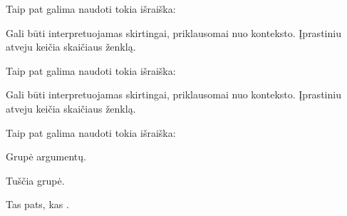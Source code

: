 \documentclass[letterpaper,10pt,lithuanian]{sphinxmanual}
\begin{document}

\begin{fulllineitems}
\label{\detokenize{formules:func.positive}}
\pysigstartsignatures
{}
\pysigstopsignatures
\sphinxAtStartPar
Taip pat galima naudoti tokia išraiška:

\begin{sphinxVerbatim}[commandchars=\\\{\}]
\end{sphinxVerbatim}

\sphinxAtStartPar
Gali būti interpretuojamas skirtingai, priklausomai nuo konteksto.
Įprastiniu atveju keičia skaičiaus ženklą.

\end{fulllineitems}


\begin{fulllineitems}
\label{\detokenize{formules:func.negative}}
\pysigstartsignatures
{}
\pysigstopsignatures
\sphinxAtStartPar
Taip pat galima naudoti tokia išraiška:

\begin{sphinxVerbatim}[commandchars=\\\{\}]
\end{sphinxVerbatim}

\sphinxAtStartPar
Gali būti interpretuojamas skirtingai, priklausomai nuo konteksto.
Įprastiniu atveju keičia skaičiaus ženklą.

\end{fulllineitems}


\begin{fulllineitems}
\label{\detokenize{formules:func.tuple}}
\pysigstartsignatures
{}
\pysigstopsignatures
\sphinxAtStartPar
Taip pat galima naudoti tokia išraiška:

\begin{sphinxVerbatim}[commandchars=\\\{\}]
\end{sphinxVerbatim}

\sphinxAtStartPar
Grupė argumentų.
\begin{description}
\sphinxlineitem{()}
\sphinxAtStartPar
Tuščia grupė.

\sphinxAtStartPar
Tas pats, kas .

\end{description}

\end{fulllineitems}
\end{document}
